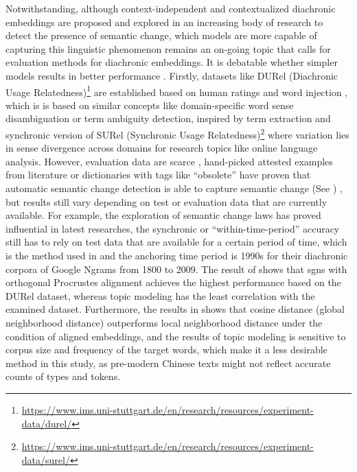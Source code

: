 Notwithstanding, although context-independent and contextualized diachronic embeddings are proposed and explored in an increasing body of research to detect the presence of semantic change, which models are more capable of capturing this linguistic phenomenon remains an on-going topic that calls for evaluation methods for diachronic embeddings. It is debatable whether simpler models results in better performance \parencite{schlechtweg2019wind}. Firstly, datasets like DURel (Diachronic Usage Relatedness)\footnote{\url{https://www.ims.uni-stuttgart.de/en/research/resources/experiment-data/durel/}} are established based on human ratings \parencite{schlechtweg2018diachronic} and word injection \parencite{schlechtweg2019wind}, which is is based on similar concepts like domain-specific word sense disambiguation or term ambiguity detection, inspired by term extraction and synchronic version of SURel (Synchronic Usage Relatedness)\footnote{\url{https://www.ims.uni-stuttgart.de/en/research/resources/experiment-data/surel/}} where variation lies in sense divergence across domains for research topics like online language analysis. However, evaluation data are scarce \parencite{wevers2020digital}, hand-picked attested examples from literature or dictionaries with tags like ``obsolete'' \parencite{hamilton2016cultural} have proven that automatic semantic change detection is able to capture semantic change (See ) \parencite{schlechtweg2019wind}, but results still vary depending on test or evaluation data that are currently available. For example, the exploration of semantic change laws has proved influential in latest researches, the synchronic or ``within-time-period'' accuracy still has to rely on test data that are available for a certain period of time, which is the method used in \textcite{hamilton2016law} and the anchoring time period is 1990s for their diachronic corpora of Google Ngrams from 1800 to 2009. The result of \textcite{schlechtweg2019wind} shows that \gls{sgns} with orthogonal Procrustes alignment achieves the highest performance based on the DURel dataset, whereas topic modeling has the least correlation with the examined dataset. Furthermore, the results in \textcite{schlechtweg2019wind,dubossarsky2017outta} shows that cosine distance (global neighborhood distance) outperforms local neighborhood distance under the condition of aligned embeddings, and the results of topic modeling is sensitive to corpus size and frequency of the target words, which make it a less desirable method in this study, as pre-modern Chinese texts might not reflect accurate counts of types and tokens.

